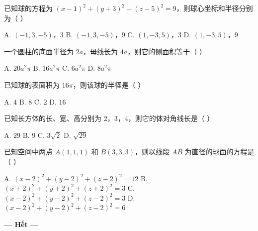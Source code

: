 \documentclass[11pt, a4paper]{article}
\begin{document}
\begin{baitap}[44]
已知球的方程为 $(x-1)^2+(y+3)^2+(z-5)^2=9$，则球心坐标和半径分别为（ ）
\par\vspace{3pt}
\noindent A. $(-1,3,-5)$，$3$ \quad B. $(-1,3,-5)$，$9$ \quad C. $(1,-3,5)$，$3$ \quad D. $(1,-3,5)$，$9$
\end{baitap}

\begin{baitap}[45]
一个圆柱的底面半径为 $2a$，母线长为 $4a$，则它的侧面积等于（ ）
\par\vspace{3pt}
\noindent A. $20a^2\pi$ \quad B. $16a^2\pi$ \quad C. $6a^2\pi$ \quad D. $8a^2\pi$
\end{baitap}

\begin{baitap}[46]
已知球的表面积为 $16\pi$，则该球的半径是（ ）
\par\vspace{3pt}
\noindent A. $4$ \quad B. $8$ \quad C. $2$ \quad D. $16$
\end{baitap}

\begin{baitap}[47]
已知长方体的长、宽、高分别为 $2$，$3$，$4$，则它的体对角线长是（ ）
\par\vspace{3pt}
\noindent A. $29$ \quad B. $9$ \quad C. $3\sqrt{2}$ \quad D. $\sqrt{29}$
\end{baitap}

\begin{baitap}[48]
已知空间中两点 $A(1,1,1)$ 和 $B(3,3,3)$，则以线段 $AB$ 为直径的球面的方程是（ ）
\par\vspace{3pt}
\noindent A. $(x-2)^2+(y-2)^2+(z-2)^2=12$ \quad B. $(x+2)^2+(y+2)^2+(z+2)^2=3$ \quad C. $(x-2)^2+(y-2)^2+(z-2)^2=3$ \quad D. $(x-2)^2+(y-2)^2+(z-2)^2=6$
\end{baitap}

\vspace{0.5cm}
\begin{center}
\textbf{--- Hết ---}
\end{center}
\end{document}
